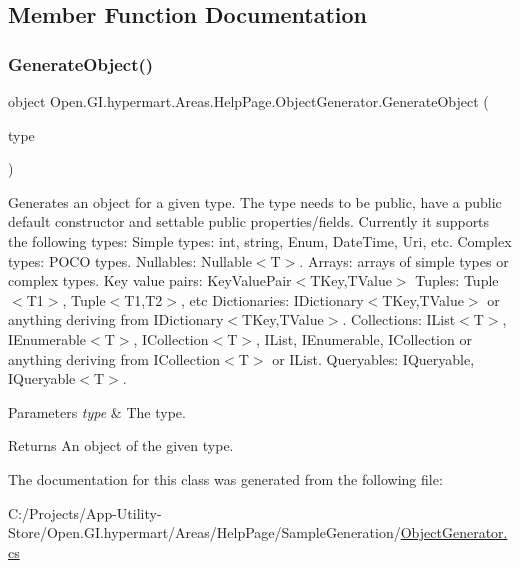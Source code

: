 \subsection{Member Function Documentation}
\hypertarget{class_open_1_1_g_i_1_1hypermart_1_1_areas_1_1_help_page_1_1_object_generator_a118924d1ff5f565e6e9c2893d36f35d2}{}\label{class_open_1_1_g_i_1_1hypermart_1_1_areas_1_1_help_page_1_1_object_generator_a118924d1ff5f565e6e9c2893d36f35d2} 
\subsubsection{\texorpdfstring{Generate\+Object()}{GenerateObject()}}
{\footnotesize\ttfamily object Open.\+G\+I.\+hypermart.\+Areas.\+Help\+Page.\+Object\+Generator.\+Generate\+Object (\begin{DoxyParamCaption}\item[{Type}]{type }\end{DoxyParamCaption})}



Generates an object for a given type. The type needs to be public, have a public default constructor and settable public properties/fields. Currently it supports the following types\+: Simple types\+: int, string, Enum, Date\+Time, Uri, etc. Complex types\+: P\+O\+CO types. Nullables\+: Nullable$<$\+T$>$. Arrays\+: arrays of simple types or complex types. Key value pairs\+: Key\+Value\+Pair$<$\+T\+Key,\+T\+Value$>$ Tuples\+: Tuple$<$\+T1$>$, Tuple$<$\+T1,\+T2$>$, etc Dictionaries\+: I\+Dictionary$<$\+T\+Key,\+T\+Value$>$ or anything deriving from I\+Dictionary$<$\+T\+Key,\+T\+Value$>$. Collections\+: I\+List$<$\+T$>$, I\+Enumerable$<$\+T$>$, I\+Collection$<$\+T$>$, I\+List, I\+Enumerable, I\+Collection or anything deriving from I\+Collection$<$\+T$>$ or I\+List. Queryables\+: I\+Queryable, I\+Queryable$<$\+T$>$. 


\begin{DoxyParams}{Parameters}
{\em type} & The type.\\
\hline
\end{DoxyParams}
\begin{DoxyReturn}{Returns}
An object of the given type.
\end{DoxyReturn}


The documentation for this class was generated from the following file\+:\begin{DoxyCompactItemize}
\item 
C\+:/\+Projects/\+App-\/\+Utility-\/\+Store/\+Open.\+G\+I.\+hypermart/\+Areas/\+Help\+Page/\+Sample\+Generation/\hyperlink{_object_generator_8cs}{Object\+Generator.\+cs}\end{DoxyCompactItemize}
